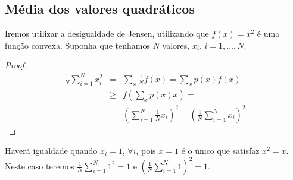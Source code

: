 \subsection{Média dos valores quadráticos}

\begin{questions}

\begin{solution}
Iremos utilizar a desigualdade de Jensen, utilizando que $f(x) = x^2$ é uma função convexa.
Suponha que tenhamos $N$ valores, $x_i$, $i=1,\ldots,N$.
  \begin{proof}
    \begin{eqnarray}
    \frac{1}{N} \sum_{i=1}^{N} x_i^2 &=& \sum_x \frac{1}{N} f(x) = \sum_x p(x) f(x) \nonumber \\
        &\geq& f \left( \sum_x p(x) x \right) = \nonumber \\
        &=& \left( \sum_{i=1}^{N} \frac{1}{N} x_i \right)^2 = \left( \frac{1}{N} \sum_{i=1}^{N} x_i \right)^2 
    \end{eqnarray}
  \end{proof}

Haverá igualdade quando $x_i = 1$, $\forall i$, pois $x=1$ é o único que satisfaz $x^2 = x$.
Neste caso teremos $\frac{1}{N} \sum_{i=1}^{N} 1^2 = 1$ e $\left( \frac{1}{N} \sum_{i=1}^{N} 1 \right)^2 = 1$.
\end{solution}
\end{questions}
